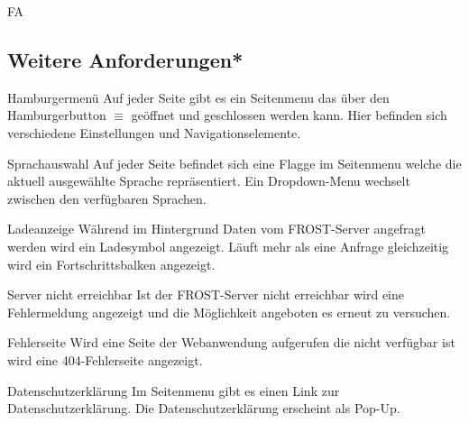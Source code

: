 \begin{Kriterien}{FA}
\subsection{Weitere Anforderungen*}

 \item[Hamburgermenü]
  Auf jeder Seite gibt es ein \gls{Seitenmenu} das über den Hamburgerbutton $\equiv$ geöffnet und geschlossen werden kann.
  Hier befinden sich verschiedene Einstellungen und Navigationselemente.

 \item[Sprachauswahl]
   Auf jeder Seite befindet sich eine Flagge im \gls{Seitenmenu} welche die aktuell ausgewählte Sprache repräsentiert.
   Ein \gls{Dropdown-Menu} wechselt zwischen den verfügbaren Sprachen.

 \item[Ladeanzeige]
  Während im Hintergrund Daten vom \gls{FROST-Server} angefragt werden wird ein Ladesymbol angezeigt.
  Läuft mehr als eine Anfrage gleichzeitig wird ein Fortschrittsbalken angezeigt.

 \item[Server nicht erreichbar]
  Ist der \gls{FROST-Server} nicht erreichbar wird eine Fehlermeldung angezeigt und die Möglichkeit angeboten es erneut zu versuchen.

 \item[Fehlerseite]
  Wird eine Seite der \gls{Webanwendung} aufgerufen die nicht verfügbar ist wird eine 404-Fehlerseite angezeigt.

 \item[Datenschutzerklärung]
  Im \gls{Seitenmenu} gibt es einen Link zur Datenschutzerklärung.
  Die Datenschutzerklärung erscheint als \gls{Pop-Up}.
\end{Kriterien}
